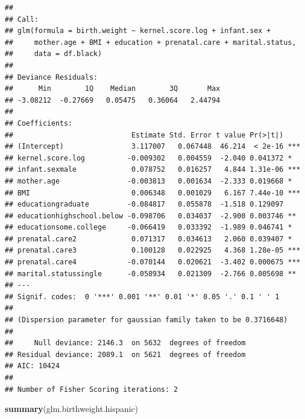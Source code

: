 \documentclass[
  12pt,
]{article}
\newenvironment{Shaded}{\begin{snugshade}}{\end{snugshade}}
\newcommand{\KeywordTok}[1]{\textcolor[rgb]{0.13,0.29,0.53}{\textbf{#1}}}
\newcommand{\NormalTok}[1]{#1}
\begin{document}
\begin{verbatim}
## 
## Call:
## glm(formula = birth.weight ~ kernel.score.log + infant.sex + 
##     mother.age + BMI + education + prenatal.care + marital.status, 
##     data = df.black)
## 
## Deviance Residuals: 
##      Min        1Q    Median        3Q       Max  
## -3.08212  -0.27669   0.05475   0.36064   2.44794  
## 
## Coefficients:
##                            Estimate Std. Error t value Pr(>|t|)    
## (Intercept)                3.117007   0.067448  46.214  < 2e-16 ***
## kernel.score.log          -0.009302   0.004559  -2.040 0.041372 *  
## infant.sexmale             0.078752   0.016257   4.844 1.31e-06 ***
## mother.age                -0.003813   0.001634  -2.333 0.019668 *  
## BMI                        0.006348   0.001029   6.167 7.44e-10 ***
## educationgraduate         -0.084817   0.055878  -1.518 0.129097    
## educationhighschool.below -0.098706   0.034037  -2.900 0.003746 ** 
## educationsome.college     -0.066419   0.033392  -1.989 0.046741 *  
## prenatal.care2             0.071317   0.034613   2.060 0.039407 *  
## prenatal.care3             0.100128   0.022925   4.368 1.28e-05 ***
## prenatal.care4            -0.070144   0.020621  -3.402 0.000675 ***
## marital.statussingle      -0.058934   0.021309  -2.766 0.005698 ** 
## ---
## Signif. codes:  0 '***' 0.001 '**' 0.01 '*' 0.05 '.' 0.1 ' ' 1
## 
## (Dispersion parameter for gaussian family taken to be 0.3716648)
## 
##     Null deviance: 2146.3  on 5632  degrees of freedom
## Residual deviance: 2089.1  on 5621  degrees of freedom
## AIC: 10424
## 
## Number of Fisher Scoring iterations: 2
\end{verbatim}

\begin{Shaded}
\begin{Highlighting}[]
\KeywordTok{summary}\NormalTok{(glm.birthweight.hispanic)}
\end{Highlighting}
\end{Shaded}
\end{document}
